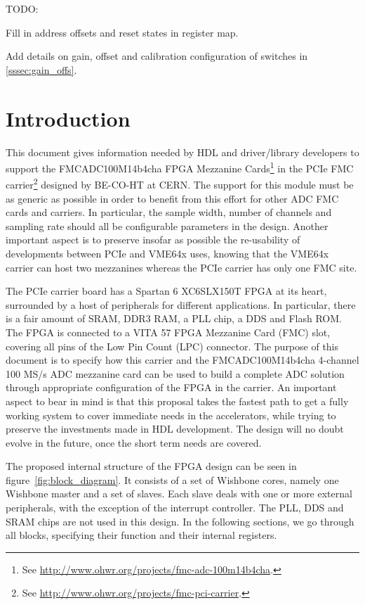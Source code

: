\documentclass{article}
\newenvironment{packed_item}{
\begin{itemize}
  \setlength{\itemsep}{1pt}
  \setlength{\parskip}{0pt}
  \setlength{\parsep}{0pt}
}{\end{itemize}}
\begin{document}
TODO: 
\begin{packed_item}
\item Fill in address offsets and reset states in register map.
\item Add details on gain, offset and calibration configuration of switches in \ref{sssec:gain_offs}.
\end{packed_item}

\pagebreak

\tableofcontents{}
\pagebreak

\section{Introduction}
This document gives information needed by HDL and driver/library developers to support the FMCADC100M14b4cha FPGA Mezzanine Cards\footnote{See \href{http://www.ohwr.org/projects/fmc-adc-100m14b4cha}{http://www.ohwr.org/projects/fmc-adc-100m14b4cha}.} in the PCIe FMC carrier\footnote{See \href{http://www.ohwr.org/projects/fmc-pci-carrier}{http://www.ohwr.org/projects/fmc-pci-carrier}.} designed by BE-CO-HT at CERN. The support for this module must be as generic as possible in order to benefit from this effort for other ADC FMC cards and carriers. In particular, the sample width, number of channels and sampling rate should all be configurable parameters in the design. Another important aspect is to preserve insofar as possible the re-usability of developments between PCIe and VME64x uses, knowing that the VME64x carrier can host two mezzanines whereas the PCIe carrier has only one FMC site.

The PCIe carrier board has a Spartan 6 XC6SLX150T FPGA at its heart, surrounded by a host of peripherals for different applications. In particular, there is a fair amount of SRAM, DDR3 RAM, a PLL chip, a DDS and Flash ROM. The FPGA is connected to a VITA 57 FPGA Mezzanine Card (FMC) slot, covering all pins of the Low Pin Count (LPC) connector. The purpose of this document is to specify how this carrier and the FMCADC100M14b4cha 4-channel 100 MS/s ADC mezzanine card can be used to build a complete ADC solution through appropriate configuration of the FPGA in the carrier. An important aspect to bear in mind is that this proposal takes the fastest path to get a fully working system to cover immediate needs in the accelerators, while trying to preserve the investments made in HDL development. The design will no doubt evolve in the future, once the short term needs are covered.

The proposed internal structure of the FPGA design can be seen in figure~\ref{fig:block_diagram}. It consists of a set of Wishbone cores, namely one Wishbone master and a set of slaves. Each slave deals with one or more external peripherals, with the exception of the interrupt controller. The PLL, DDS and SRAM chips are not used in this design. In the following sections, we go through all blocks, specifying their function and their internal registers.
\end{document}
